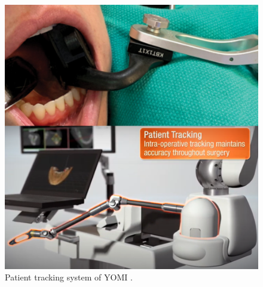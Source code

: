 \par
\begin{figure}[htbp]
\begin{center}
\includegraphics[width=0.85\linewidth]{Images/patient_tracking.png}
\caption[Patient tracking system of YOMI]{
Patient tracking system of YOMI \cite{intraoral_splint}. 
}\label{fig:patient_tracking}
\end{center}
\end{figure}
